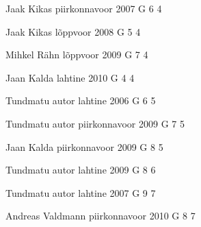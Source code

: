 \documentclass[11pt]{article}
\begin{document}
{Jaak Kikas} %
{piirkonnavoor} %
{2007} %
{G 6} %
{4} %
{

\ifEngHint
\fi
}

{Jaak Kikas} %
{lõppvoor} %
{2008} %
{G 5} %
{4} %
{

\ifEngHint
\fi
}

{Mihkel Rähn} %
{lõppvoor} %
{2009} %
{G 7} %
{4} %
{

\ifEngHint
\fi
}

{Jaan Kalda} %
{lahtine} %
{2010} %
{G 4} %
{4} %
{

\ifEngHint
\fi
}

{Tundmatu autor} %
{lahtine} %
{2006} %
{G 6} %
{5} %
{

\ifEngHint
\fi
}

{Tundmatu autor} %
{piirkonnavoor} %
{2009} %
{G 7} %
{5} %
{

\ifEngHint
\fi
}

{Jaan Kalda} %
{piirkonnavoor} %
{2009} %
{G 8} %
{5} %
{

\ifEngHint
\fi
}

{Tundmatu autor} %
{lahtine} %
{2009} %
{G 8} %
{6} %
{

\ifEngHint
\fi
}

{Tundmatu autor} %
{lahtine} %
{2007} %
{G 9} %
{7} %
{

\ifEngHint
\fi
}

{Andreas Valdmann} %
{piirkonnavoor} %
{2010} %
{G 8} %
{7} %
{

\ifEngHint
\fi
}
\end{document}

